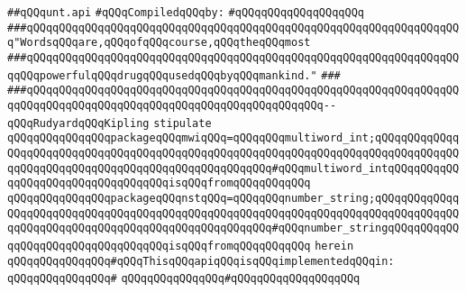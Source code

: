 \label{src/lib/std/src/unt.api}
\verb|##qQQqunt.api|\newline
\newline
\verb|#qQQqCompiledqQQqby:|\newline
\verb|#qQQqqQQqqQQqqQQqqQQq|\newline
\newline
\newline
\newline
\verb|###qQQqqQQqqQQqqQQqqQQqqQQqqQQqqQQqqQQqqQQqqQQqqQQqqQQqqQQqqQQqqQQqqQQq"WordsqQQqare,qQQqofqQQqcourse,qQQqtheqQQqmost|\newline
\verb|###qQQqqQQqqQQqqQQqqQQqqQQqqQQqqQQqqQQqqQQqqQQqqQQqqQQqqQQqqQQqqQQqqQQqqQQqpowerfulqQQqdrugqQQqusedqQQqbyqQQqmankind."|\newline
\verb|###|\newline
\verb|###qQQqqQQqqQQqqQQqqQQqqQQqqQQqqQQqqQQqqQQqqQQqqQQqqQQqqQQqqQQqqQQqqQQqqQQqqQQqqQQqqQQqqQQqqQQqqQQqqQQqqQQqqQQqqQQqqQQq--qQQqRudyardqQQqKipling|\newline
\newline
\newline
\newline
\verb|stipulate|\newline
\verb|qQQqqQQqqQQqqQQqpackageqQQqmwiqQQq=qQQqqQQqmultiword_int;qQQqqQQqqQQqqQQqqQQqqQQqqQQqqQQqqQQqqQQqqQQqqQQqqQQqqQQqqQQqqQQqqQQqqQQqqQQqqQQqqQQqqQQqqQQqqQQqqQQqqQQqqQQqqQQqqQQqqQQqqQQq#qQQqmultiword_intqQQqqQQqqQQqqQQqqQQqqQQqqQQqqQQqqQQqisqQQqfromqQQqqQQqqQQq|\newline
\verb|qQQqqQQqqQQqqQQqpackageqQQqnstqQQq=qQQqqQQqnumber_string;qQQqqQQqqQQqqQQqqQQqqQQqqQQqqQQqqQQqqQQqqQQqqQQqqQQqqQQqqQQqqQQqqQQqqQQqqQQqqQQqqQQqqQQqqQQqqQQqqQQqqQQqqQQqqQQqqQQqqQQqqQQq#qQQqnumber_stringqQQqqQQqqQQqqQQqqQQqqQQqqQQqqQQqqQQqisqQQqfromqQQqqQQqqQQq|\newline
\verb|herein|\newline
\newline
\verb|qQQqqQQqqQQqqQQq#qQQqThisqQQqapiqQQqisqQQqimplementedqQQqin:|\newline
\verb|qQQqqQQqqQQqqQQq#|\newline
\verb|qQQqqQQqqQQqqQQq#qQQqqQQqqQQqqQQqqQQq|\newline
